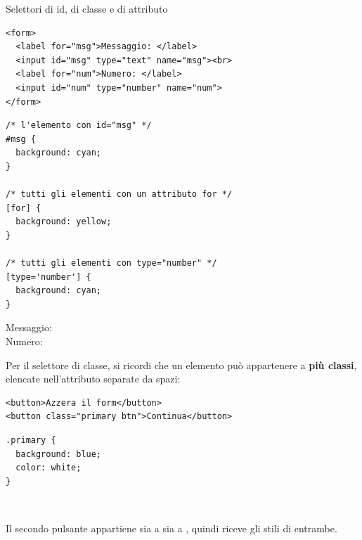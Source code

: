 \begin{esempio}{Selettori di id, di classe e di attributo}
\begin{affianco}[0.58]
\begin{lstlisting}[style=html, name=form.html]
<form>
  <label for="msg">Messaggio: </label>
  <input id="msg" type="text" name="msg"><br>
  <label for="num">Numero: </label>
  <input id="num" type="number" name="num">
</form>
\end{lstlisting}
\begin{lstlisting}[style=css, name=form.css]
/* l'elemento con id="msg" */
#msg {
  background: cyan;
}

/* tutti gli elementi con un attributo for */
[for] {
  background: yellow;
}

/* tutti gli elementi con type="number" */
[type='number'] {
  background: cyan;
}
\end{lstlisting}
\risultato
\begin{browser}
  \colorbox{css-yellow}{Messaggio:}\ \\[5pt]
  \colorbox{css-yellow}{Numero:}\ 
\end{browser}
\end{affianco}

Per il selettore di classe, si ricordi che un elemento può appartenere a
\textbf{più classi}, elencate nell'attributo  separate da spazi:

\begin{affianco}[0.58]
\begin{lstlisting}[style=html, name=bottoni.html]
<button>Azzera il form</button>
<button class="primary btn">Continua</button>
\end{lstlisting}
\begin{lstlisting}[style=css, name=bottoni.css]
.primary {
  background: blue;
  color: white;
}
\end{lstlisting}
\risultato
\begin{browser}
  \ 
\end{browser}
\end{affianco}

Il secondo pulsante appartiene sia a  sia a , quindi
riceve gli stili di entrambe.
\end{esempio}

